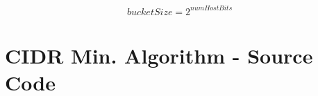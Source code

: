 \begin{appendices}
\begin{equation}\label{eq:bucketSizeHostBits2}
bucketSize = 2^{numHostBits}
\end{equation}

\vfill





\chapter{CIDR Min. Algorithm - Source Code}
\label{appendix:cidrMinSource}

\end{appendices}